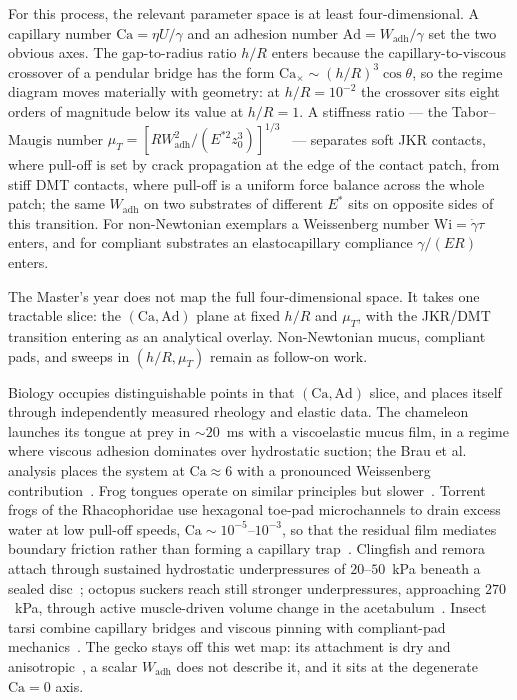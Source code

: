 \documentclass[11pt]{article}
\begin{document}
For this process, the relevant parameter space is at least four-dimensional. A capillary number $\mathrm{Ca} = \eta U / \gamma$ and an adhesion number $\mathrm{Ad} = W_{\mathrm{adh}}/\gamma$ set the two obvious axes. The gap-to-radius ratio $h/R$ enters because the capillary-to-viscous crossover of a pendular bridge has the form $\mathrm{Ca}_\times \sim (h/R)^3 \cos\theta$, so the regime diagram moves materially with geometry: at $h/R = 10^{-2}$ the crossover sits eight orders of magnitude below its value at $h/R = 1$. A stiffness ratio --- the Tabor--Maugis number $\mu_T = [RW_{\mathrm{adh}}^2/(E^{*2} z_0^3)]^{1/3}$~\citep{maugis1992adhesion} --- separates soft JKR contacts, where pull-off is set by crack propagation at the edge of the contact patch, from stiff DMT contacts, where pull-off is a uniform force balance across the whole patch; the same $W_{\mathrm{adh}}$ on two substrates of different $E^*$ sits on opposite sides of this transition. For non-Newtonian exemplars a Weissenberg number $\mathrm{Wi} = \dot\gamma\tau$ enters, and for compliant substrates an elastocapillary compliance $\gamma/(ER)$ enters.

The Master's year does not map the full four-dimensional space. It takes one tractable slice: the $(\mathrm{Ca}, \mathrm{Ad})$ plane at fixed $h/R$ and $\mu_T$, with the JKR/DMT transition entering as an analytical overlay. Non-Newtonian mucus, compliant pads, and sweeps in $(h/R, \mu_T)$ remain as follow-on work.

Biology occupies distinguishable points in that $(\mathrm{Ca}, \mathrm{Ad})$ slice, and places itself through independently measured rheology and elastic data. The chameleon launches its tongue at prey in $\sim 20$~ms with a viscoelastic mucus film, in a regime where viscous adhesion dominates over hydrostatic suction; the Brau et al. analysis places the system at $\mathrm{Ca} \approx 6$ with a pronounced Weissenberg contribution~\citep{brauChameleonTongue2016}. Frog tongues operate on similar principles but slower~\citep{noelHuFrogTongue2017}. Torrent frogs of the Rhacophoridae use hexagonal toe-pad microchannels to drain excess water at low pull-off speeds, $\mathrm{Ca} \sim 10^{-5}$--$10^{-3}$, so that the residual film mediates boundary friction rather than forming a capillary trap~\citep{barnesTreeFrogToePads2007,drotlefRockFrogToePad2015}. Clingfish and remora attach through sustained hydrostatic underpressures of $20$--$50$~kPa beneath a sealed disc~\citep{wainwrightClingfishSuction2013}; octopus suckers reach still stronger underpressures, approaching $270$~kPa, through active muscle-driven volume change in the acetabulum~\citep{smithOctopusSucker1991}. Insect tarsi combine capillary bridges and viscous pinning with compliant-pad mechanics~\citep{dirksFederleInsectAdhesion2011,federleAdhesivePadsHairy2006}. The gecko stays off this wet map: its attachment is dry and anisotropic~\citep{autumnGeckoSeta2000}, a scalar $W_{\mathrm{adh}}$ does not describe it, and it sits at the degenerate $\mathrm{Ca} = 0$ axis.
\end{document}

